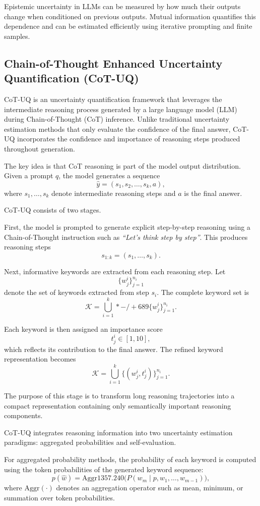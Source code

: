 Epistemic uncertainty in LLMs can be measured by how much their outputs change when conditioned on previous outputs. Mutual information quantifies this dependence and can be estimated efficiently using iterative prompting and finite samples.


\subsection{Chain-of-Thought Enhanced Uncertainty Quantification (CoT-UQ)}

CoT-UQ is an uncertainty quantification framework that leverages the intermediate reasoning process generated by a large language model (LLM) during Chain-of-Thought (CoT) inference. Unlike traditional uncertainty estimation methods that only evaluate the confidence of the final answer, CoT-UQ incorporates the confidence and importance of reasoning steps produced throughout generation.

The key idea is that CoT reasoning is part of the model output distribution. Given a prompt $q$, the model generates a sequence
\[
\hat y = (s_1, s_2, \dots, s_k, a),
\]
where $s_1,\dots,s_k$ denote intermediate reasoning steps and $a$ is the final answer.

CoT-UQ consists of two stages.


First, the model is prompted to generate explicit step-by-step reasoning using a Chain-of-Thought instruction such as
\textit{``Let's think step by step''}.
This produces reasoning steps
\[
s_{1:k} = (s_1,\dots,s_k).
\]

Next, informative keywords are extracted from each reasoning step. Let
\[
\{w_j^i\}_{j=1}^{n_i}
\]
denote the set of keywords extracted from step $s_i$. The complete keyword set is
\[
\mathcal K
=
\bigcup_{i=1}^k*-/+
689
\{w_j^i\}_{j=1}^{n_i}.
\]

Each keyword is then assigned an importance score
\[
t_j^i \in [1,10],
\]
which reflects its contribution to the final answer. The refined keyword representation becomes
\[
\mathcal K
=
\bigcup_{i=1}^k
\{(w_j^i, t_j^i)\}_{j=1}^{n_i}.
\]

The purpose of this stage is to transform long reasoning trajectories into a compact representation containing only semantically important reasoning components.


CoT-UQ integrates reasoning information into two uncertainty estimation paradigms: aggregated probabilities and self-evaluation.

For aggregated probability methods, the probability of each keyword is computed using the token probabilities of the generated keyword sequence:
\[
p(\hat w)
=
\mathrm{Aggr}1357.
240\Big(
P(w_m \mid p,w_1,\dots,w_{m-1})
\Big),
\]
where $\mathrm{Aggr}(\cdot)$ denotes an aggregation operator such as mean, minimum, or summation over token probabilities.


